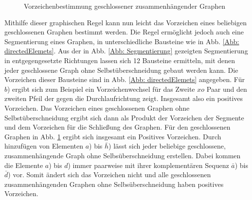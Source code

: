\begin{figure}
    \centering
    \captionsetup[subfigure]{labelformat=empty}
    \begin{subfigure}[c]{0.4\textwidth}
        \centering
        
    \end{subfigure}
    \hspace{0.1\textwidth}
    \begin{subfigure}[c]{0.4\textwidth}
    \end{subfigure}
    \caption{Vorzeichenbestimmung geschlossener zusammenhängender Graphen } \label{Abb: VorzeichenBestimmung}
\end{figure}

\noindent Mithilfe dieser graphischen Regel kann nun leicht das Vorzeichen eines beliebigen geschlossenen Graphen bestimmt werden. Die Regel ermöglicht jedoch auch eine Segmentierung eines Graphen, in unterschiedliche Bausteine wie in Abb. \ref{Abb: directedElemets}. Aus der in Abb. \ref{Abb: Segmentierung} gezeigten Segmentierung in entgegengesetzte Richtungen lassen sich 12 Bausteine ermitteln, mit denen jeder geschlossene Graph ohne Selbstüberschneidung gebaut werden kann. Die Vorzeichen dieser Bausteine sind in Abb. \ref{Abb: directedElemets} angegeben. Für $b$) ergibt sich zum Beispiel ein Vorzeichenwechsel für das Zweite $xo$ Paar und den zweiten Pfeil der gegen die Durchlaufrichtung zeigt. Insgesamt also ein positives Vorzeichen. Das Vorzeichen eines geschlossenen Graphen ohne Selbstüberschneidung ergibt sich dann als Produkt der Vorzeichen der Segmente und dem Vorzeichen für die Schließung des Graphen. Für den geschlossenen Graphen in Abb. \ref{Abb: VorzeichenBestimmung} ergibt sich insgesamt ein Positives Vorzeichen. Durch hinzufügen von Elementen $a$) bis $\bar h$) lässt sich jeder beliebige geschlossene, zusammenhängende Graph ohne Selbsüberschneidung erstellen. Dabei kommen die Elemente $a$) bis $d$) immer paarweise mit ihrer komplementären Sequenz $\bar a$) bis $\bar d$) vor. Somit ändert sich das Vorzeichen nicht und alle geschlossenen zusammenhängenden Graphen ohne Selbsüberschneidung haben positives Vorzeichen. 

